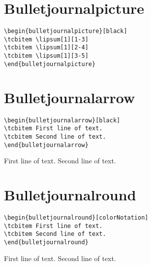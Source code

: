 
\section{Bulletjournalpicture}

\lipsum[1][1-3]

\begin{verbatim}
\begin{bulletjournalpicture}[black]
\tcbitem \lipsum[1][1-3]
\tcbitem \lipsum[1][2-4]
\tcbitem \lipsum[1][3-5]
\end{bulletjournalpicture}
\end{verbatim}

\begin{bulletjournalpicture}[black]
\tcbitem \lipsum[1][1-3]
\tcbitem \lipsum[1][2-4]
\tcbitem \lipsum[1][3-5]
\end{bulletjournalpicture}

\section{Bulletjournalarrow}

\lipsum[1][1-3]

\begin{verbatim}
\begin{bulletjournalarrow}[black]
\tcbitem First line of text.
\tcbitem Second line of text.
\end{bulletjournalarrow}
\end{verbatim}
\begin{bulletjournalarrow}[black]
\tcbitem First line of text.
\tcbitem Second line of text.
\end{bulletjournalarrow}





\section{Bulletjournalround}

\begin{verbatim}
\begin{bulletjournalround}[colorNotation]
\tcbitem First line of text.
\tcbitem Second line of text.
\end{bulletjournalround}
\end{verbatim}
\begin{bulletjournalround}[colorNotation]
\tcbitem First line of text.
\tcbitem Second line of text.
\end{bulletjournalround}


